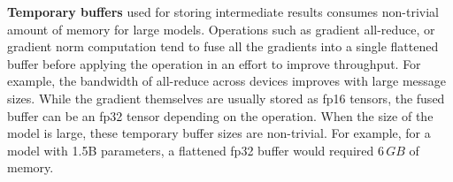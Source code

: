 \begin{comment}
the amount of activation memory for a transformer based language model is proportional to the batch size, sequence length, hidden dimension and the number of layers . 
Activations take a non-trivial amount of memory even when using techniques such as activation checkpointing which significantly reduce the memory required by the activations at the expense of a $33\%$ re-computation overhead\cite{}.


For example, lets consider the 1.5B parameter GPT-2 model. Without activation checkpointing a transformer model produces $O(\frac{model\_size}{hidden\_dim}*seq\_length*batch$) activation, while with activation checkpointing it produces $O(\frac{model\_size}{hidden\_dim}*seq\_length*batch$) activations if we stored the activations only at the transformer layer boundary. For a batch size of 32, the GPT-2 models will therefore produce about 60GB of activations in fp16, while with activation checkpointing, it produces about 5 GB of activations.
\end{comment}

\textbf{Temporary buffers} used for storing intermediate results consumes non-trivial amount of memory for large models.   Operations such as gradient all-reduce, or gradient norm computation tend to fuse all the gradients into a single flattened buffer before applying the operation in an effort to improve throughput. For example, the bandwidth of all-reduce across devices improves with large message sizes. While the gradient themselves are usually stored as fp16 tensors, the fused buffer can be an fp32 tensor depending on the operation. When the size of the model is large, these temporary buffer sizes are non-trivial. For example, for a model with 1.5B parameters, a flattened fp32 buffer would required $6\,GB$ of memory. 

